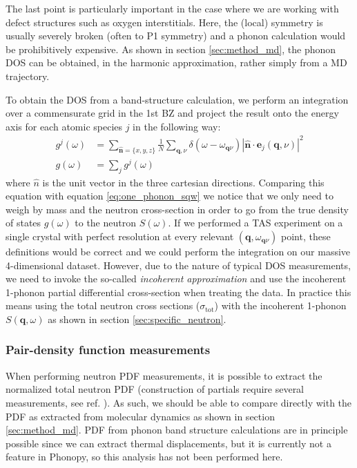 \noindent The last point is particularly important in the case where we are working with defect structures such as oxygen interstitials. Here, the (local) symmetry is usually severely broken (often to P1 symmetry) and a phonon calculation would be prohibitively expensive. As shown in section \ref{sec:method_md}, the phonon DOS can be obtained, in the harmonic approximation, rather simply from a MD trajectory.

To obtain the DOS from a band-structure calculation, we perform an integration over a commensurate grid in the 1st BZ and project the result onto the energy axis for each atomic species $j$ in the following way:
%
\begin{align*}
	g^j (\omega) &= \sum_{\bm{\hat{n}}=\{x,y,z\}} \frac{1}{N} \sum_{\bm{q},\nu} \delta(\omega - \omega_{\bm{q}\nu}) \left| \bm{\hat{n}} \cdot \bm{e}_j(\bm{q},\nu) \right| ^2 \\
	g(\omega) &= \sum_j g^j(\omega)
\end{align*}
%
where $\hat{n}$ is the unit vector in the three cartesian directions. Comparing this equation with equation \eqref{eq:one_phonon_sqw} we notice that we only need to weigh by mass and the neutron cross-section in order to go from the true density of states $g(\omega)$ to the neutron $S(\omega)$. If we performed a TAS experiment on a single crystal with perfect resolution at every relevant $(\bm{q},\omega_{\bm{q}\nu})$ point, these definitions would be correct and we could perform the integration on our massive 4-dimensional dataset. However, due to the nature of typical DOS measurements, we need to invoke the so-called \emph{incoherent approximation} and use the incoherent 1-phonon partial differential cross-section when treating the data. In practice this means using the total neutron cross sections ($\sigma_\text{tot}$) with the incoherent 1-phonon $S(\bm{q},\omega)$ as shown in section \ref{sec:specific_neutron}.

\subsubsection{Pair-density function measurements}
When performing neutron PDF measurements, it is possible to extract the normalized total neutron PDF (construction of partials require several measurements, see ref. \cite{Fischer2005}). As such, we should be able to compare directly with the PDF as extracted from molecular dynamics as shown in section \ref{sec:method_md}. PDF from phonon band structure calculations are in principle possible since we can extract thermal displacements, but it is currently not a feature in Phonopy, so this analysis has not been performed here. 
